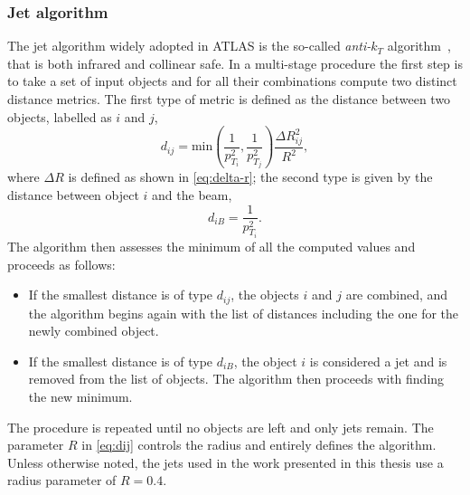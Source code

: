 \subsubsection{Jet algorithm}
\label{subsubsec:jet-algorithm}
The jet algorithm widely adopted in ATLAS is the so-called \emph{anti-$k_T$} algorithm~\cite{Cacciari:2008gp}, that is both infrared and collinear safe.
In a multi-stage procedure the first step is to take a set of input objects and for all their combinations compute two distinct distance metrics.
The first type of metric is defined as the distance between two objects, labelled as $i$ and $j$,
\begin{equation}
    d_{ij} = \text{min}\left(\frac{1}{p_{T_i}^2},\frac{1}{p_{T_j}^2}\right) \frac{\Delta R_{ij}^2}{R^2},
    \label{eq:dij}
\end{equation}
where $\Delta R$ is defined as shown in \cref{eq:delta-r}; the second type is given by the distance between object $i$ and the beam,
\begin{equation}
    d_{iB} = \frac{1}{p_{T_i}^2}.
\end{equation}
The algorithm then assesses the minimum of all the computed values and proceeds as follows:
\begin{itemize}
    \item If the smallest distance is of type $d_{ij}$, the objects $i$ and $j$ are combined, and the algorithm begins again with the list of distances including the one for the newly combined object.
    \item If the smallest distance is of type $d_{iB}$, the object $i$ is considered a jet and is removed from the list of objects. The algorithm then proceeds with finding the new minimum.
\end{itemize}
The procedure is repeated until no objects are left and only jets remain.
The parameter $R$ in \cref{eq:dij} controls the radius and entirely defines the algorithm.
Unless otherwise noted, the jets used in the work presented in this thesis use a radius parameter of $R = 0.4$.


